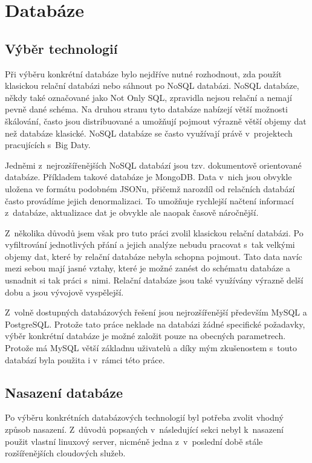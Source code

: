 \documentclass[thesis=B,czech]{FITthesis}[2012/06/26]
\begin{document}
\section{Databáze}
\subsection{Výběr technologií}
	Při výběru konkrétní databáze bylo nejdříve nutné rozhodnout, zda použít klasickou relační databázi nebo sáhnout po NoSQL databázi. NoSQL databáze, někdy také označované jako Not Only SQL, zpravidla nejsou relační a nemají pevně dané schéma. Na druhou stranu tyto databáze nabízejí větší možnosti škálování, často jsou distribuované a umožňují pojmout výrazně větší objemy dat než databáze klasické\cite{nosql-dbs}. NoSQL databáze se často využívají právě v~projektech pracujících s~Big Daty. 
	
	Jedněmi z~nejrozšířenějších NoSQL databází jsou tzv. dokumentově orientované databáze. Příkladem takové databáze je MongoDB\cite{mongo}. Data v~nich jsou obvykle uložena ve formátu podobném JSONu, přičemž narozdíl od relačních databází často provádíme jejich denormalizaci. To umožňuje rychlejší načtení informací z~databáze, aktualizace dat je obvykle ale naopak časově náročnější\cite{nosql-speed}. 
	
	Z~několika důvodů jsem však pro tuto práci zvolil klasickou relační databázi. Po vyfiltrování jednotlivých přání a jejich analýze nebudu pracovat s~tak velkými objemy dat, které by relační databáze nebyla schopna pojmout. Tato data navíc mezi sebou mají jasné vztahy, které je možné zanést do schématu databáze a usnadnit si tak práci s~nimi. Relační databáze jsou také využívány výrazně delší dobu a jsou vývojově vyspělejší. 
	
	Z~volně dostupných databázových řešení jsou nejrozšířenější především MySQL a PostgreSQL. Protože tato práce neklade na databázi žádné specifické požadavky, výběr konkrétní databáze je možné založit pouze na obecných parametrech. Protože má MySQL větší základnu uživatelů a díky mým zkušenostem s~touto databází byla použita i v~rámci této práce. 
	
\subsection{Nasazení databáze}
	Po výběru konkrétních databázových technologií byl potřeba zvolit vhodný způsob nasazení. Z~důvodů popsaných v~následující sekci nebyl k~nasazení použit vlastní linuxový server, nicméně jedna z~v~poslední době stále rozšířenějších cloudových služeb. 
	
\end{document}
